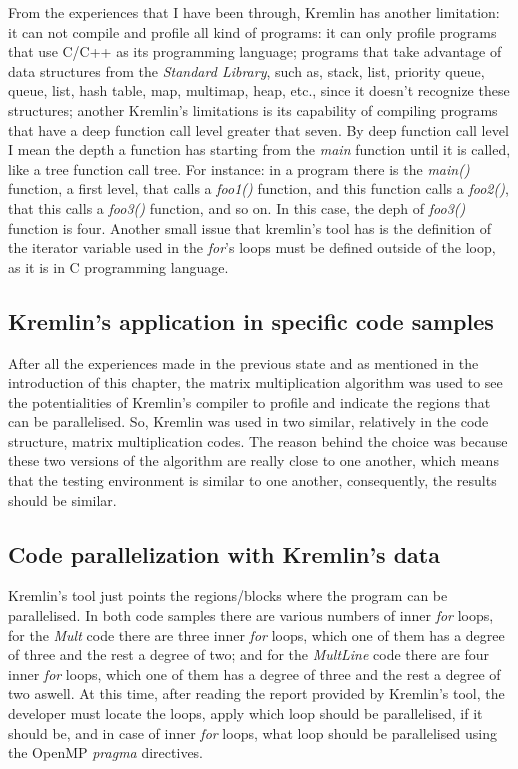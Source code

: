 From the experiences that I have been through, Kremlin has another limitation: it can not compile and profile all kind of programs: it can only profile programs that use C/C++ as its programming language; programs that take advantage of data structures from the \textit{Standard Library}, such as, stack, list, priority queue, queue, list, hash table, map, multimap, heap, etc., since it doesn't recognize these structures; another Kremlin's limitations is its capability of compiling programs that have a deep function call level greater that seven. By deep function call level I mean the depth a function has starting from the \textit{main} function until it is called, like a tree function call tree. For instance: in a program there is the \textit{main()} function, a first level, that calls a \textit{foo1()} function, and this function calls a \textit{foo2()}, that this calls a \textit{foo3()} function, and so on. In this case, the deph of \textit{foo3()} function is four. Another small issue that kremlin's tool has is the definition of the iterator variable used in the \textit{for}'s loops must be defined outside of the loop, as it is in C programming language.


\subsection{Kremlin's application in specific code samples}

After all the experiences made in the previous state and as mentioned in the introduction of this chapter, the matrix multiplication algorithm was used to see the potentialities of Kremlin's compiler to profile and indicate the regions that can be parallelised. So, Kremlin was used in two similar, relatively in the code structure, matrix multiplication codes. The reason behind the choice was because these two versions of the algorithm are really close to one another, which means that the testing environment is similar to one another, consequently, the results should be similar. 

\subsection{Code parallelization with Kremlin's data}

Kremlin's tool just points the regions/blocks where the program can be parallelised. In both code samples there are various numbers of inner \textit{for} loops, for the \textit{Mult} code  there are three inner \textit{for} loops, which one of them has a degree of three and the rest a degree of two; and for the \textit{MultLine} code there are four inner \textit{for} loops, which one of them has a degree of three and the rest a degree of two aswell. At this time, after reading the report provided by Kremlin's tool, the developer must locate the loops, apply which loop should be parallelised, if it should be, and in case of inner \textit{for} loops, what loop should be parallelised using the OpenMP \textit{pragma} directives.

